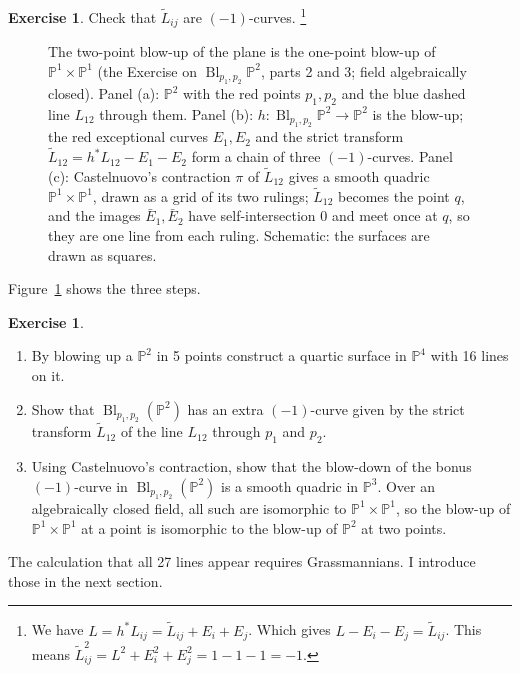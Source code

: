 \documentclass[12pt]{article}
\numberwithin{equation}{section}
\theoremstyle{definition}
\newtheorem{exercise}[theorem]{Exercise}
\theoremstyle{remark}
\newcommand{\PP}{\mathbb{P}}
\newcommand{\Bl}{\operatorname{Bl}}
\begin{document}
\begin{exercise}
	Check that $\widetilde{L}_{ij}$ are $(-1)$-curves.
	\footnote{We have $L=h^*L_{ij} = \widetilde{L}_{ij}+E_i+E_j$.
		Which gives $L-E_i-E_j = \widetilde{L}_{ij}$. 
		This means $\widetilde{L}_{ij}^2 = L^2 +E_i^2+E_j^2=1-1-1=-1$. }
\end{exercise}

\begin{figure}[H]
\centering

\caption{The two-point blow-up of the plane is the one-point blow-up of $\PP^1\times\PP^1$ (the Exercise on $\Bl_{p_1,p_2}\PP^2$, parts 2 and 3; field algebraically closed). Panel (a): $\PP^2$ with the red points $p_1,p_2$ and the blue dashed line $L_{12}$ through them. Panel (b): $h\colon\Bl_{p_1,p_2}\PP^2\to\PP^2$ is the blow-up; the red exceptional curves $E_1,E_2$ and the strict transform $\widetilde L_{12}=h^*L_{12}-E_1-E_2$ form a chain of three $(-1)$-curves. Panel (c): Castelnuovo's contraction $\pi$ of $\widetilde L_{12}$ gives a smooth quadric $\PP^1\times\PP^1$, drawn as a grid of its two rulings; $\widetilde L_{12}$ becomes the point $q$, and the images $\bar E_1,\bar E_2$ have self-intersection $0$ and meet once at $q$, so they are one line from each ruling. Schematic: the surfaces are drawn as squares.}\label{fig:bl2-p2-quadric}
\end{figure}
Figure~\ref{fig:bl2-p2-quadric} shows the three steps.

\begin{exercise}
	\begin{enumerate}
		\item By blowing up a $\PP^2$ in 5 points construct a quartic surface in $\PP^4$ with 16 lines on it.
		\item Show that $\Bl_{p_1,p_2}(\PP^2)$ has an extra $(-1)$-curve given by the strict transform $\widetilde{L}_{12}$ of the line $L_{12}$ through $p_1$ and $p_2$. 
		\item Using Castelnuovo's contraction, show that the blow-down of the bonus $(-1)$-curve in $\Bl_{p_1,p_2}(\PP^2)$ is a smooth quadric in $\PP^3$. 
		Over an algebraically closed field, all such are isomorphic to $\PP^1\times \PP^1$, so the blow-up of $\PP^1\times \PP^1$ at a point is isomorphic to the blow-up of $\PP^2$ at two points. 
	\end{enumerate}
\end{exercise}

The calculation that all 27 lines appear requires Grassmannians.
I introduce those in the next section.
\end{document}
